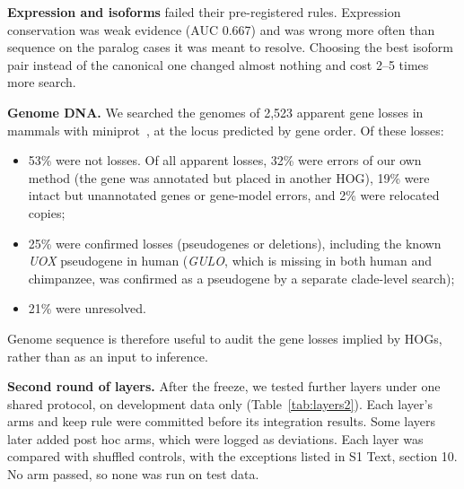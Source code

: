 \textbf{Expression and isoforms} failed their pre-registered rules. Expression conservation was weak evidence (AUC 0.667) and was wrong more often than sequence on the paralog cases it was meant to resolve. Choosing the best isoform pair instead of the canonical one changed almost nothing and cost 2--5 times more search.

\textbf{Genome DNA.} We searched the genomes of 2,523 apparent gene losses in mammals with miniprot~\cite{li2023miniprot}, at the locus predicted by gene order. Of these losses:
\begin{itemize}
\item 53\% were not losses. Of all apparent losses, 32\% were errors of our own method (the gene was annotated but placed in another HOG), 19\% were intact but unannotated genes or gene-model errors, and 2\% were relocated copies;
\item 25\% were confirmed losses (pseudogenes or deletions), including the known \textit{UOX} pseudogene in human (\textit{GULO}, which is missing in both human and chimpanzee, was confirmed as a pseudogene by a separate clade-level search);
\item 21\% were unresolved.
\end{itemize} Genome sequence is therefore useful to audit the gene losses implied by HOGs, rather than as an input to inference.

\textbf{Second round of layers.} After the freeze, we tested further layers under one shared protocol, on development data only (Table~\ref{tab:layers2}). Each layer's arms and keep rule were committed before its integration results. Some layers later added post hoc arms, which were logged as deviations. Each layer was compared with shuffled controls, with the exceptions listed in S1 Text, section 10. No arm passed, so none was run on test data.


